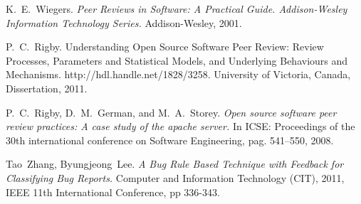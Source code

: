 \documentclass[10pt, conference]{IEEEtran}
\begin{document}
\begin{thebibliography}{1}
K.~E.~Wiegers. \emph{Peer Reviews in Software: A Practical 
Guide. Addison-Wesley Information Technology Series.} 
Addison-Wesley, 2001.

P.~C.~Rigby. Understanding Open Source Software Peer 
Review: Review Processes, Parameters and Statistical 
Models, and Underlying Behaviours and Mechanisms. 
http://hdl.handle.net/1828/3258. University of Victoria, 
Canada, Dissertation, 2011.

P.~C.~Rigby, D.~M.~German, and  M.~A.~Storey. \emph{Open
source software peer review practices: A case study of the apache server.} 
In ICSE: Proceedings of the 30th international conference on Software Engineering, 
pag. 541–550, 2008.  

Tao~Zhang, Byungjeong~Lee. \emph{A Bug Rule Based Technique with Feedback for 
Classifying Bug Reports.} Computer and Information Technology (CIT), 2011, 
IEEE 11th International Conference, pp 336-343.

\end{thebibliography}




\end{document}
